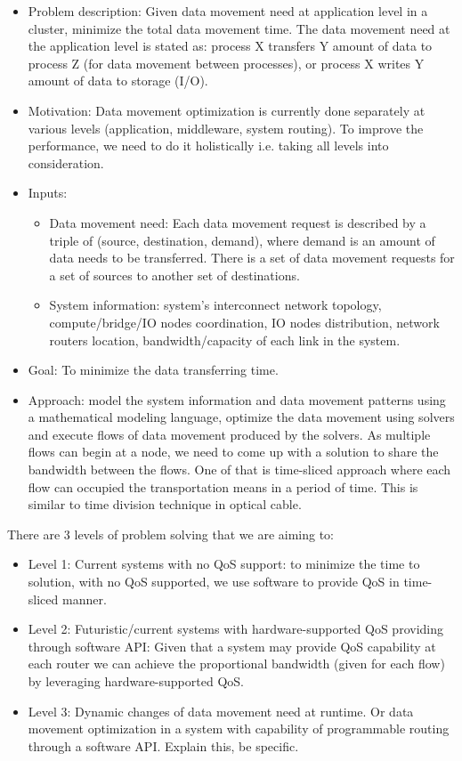\documentclass[letter]{article}
\begin{document}
\begin{itemize}
\item Problem description: Given data movement need at application level in a cluster, minimize the total data movement time. The data movement need at the application level is stated as: process X transfers Y amount of data to process Z (for data movement between processes), or process X writes Y amount of data to storage (I/O).
\item Motivation: Data movement optimization is currently done separately at various levels (application, middleware, system routing). To improve the performance, we need to do it holistically i.e. taking all levels into consideration.
\item Inputs: 
\begin{itemize}
\item Data movement need: Each data movement request is described by a triple of (source, destination, demand), where demand is an amount of data needs to be transferred. There is a set of data movement requests for a set of sources to another set of destinations.
\item System information: system's interconnect network topology, compute/bridge/IO nodes coordination, IO nodes distribution, network routers location, bandwidth/capacity of each link in the system. 
\end{itemize}
\item Goal: To minimize the data transferring time.
\item Approach: model the system information and data movement patterns using a mathematical modeling language, optimize the data movement using solvers and execute  flows of data movement produced by the solvers. As multiple flows can begin at a node, we need to come up with a solution to share the bandwidth between the flows. One of that is time-sliced approach where each flow can occupied the transportation means in a period of time. This is similar to time division technique in optical cable.
\end{itemize}

There are 3 levels of problem solving that we are aiming to:
\begin{itemize}
\item Level 1: Current systems with no QoS support: to minimize the time to solution, with no QoS supported, we use software to provide QoS in time-sliced manner.
\item Level 2: Futuristic/current systems with hardware-supported QoS providing through software API: Given that a system may provide QoS capability at each router we can achieve the proportional bandwidth (given for each flow) by leveraging hardware-supported QoS.
\item Level 3: Dynamic changes of data movement need at runtime. Or data movement optimization in a system with capability of programmable routing through a software API. Explain this, be specific.
\end{itemize}
\end{document}
